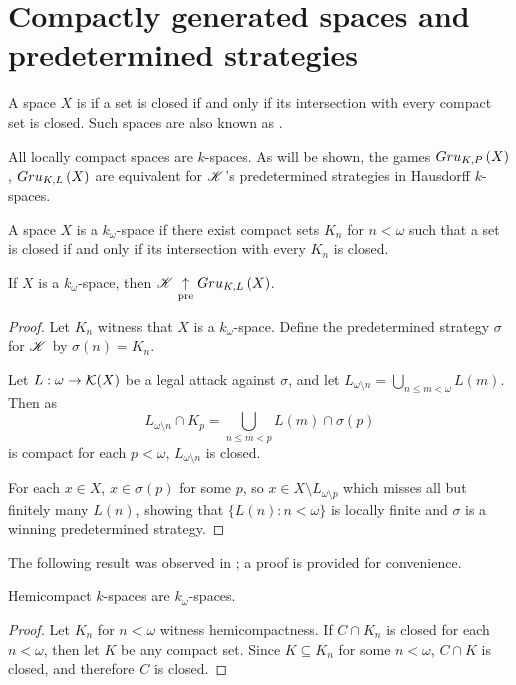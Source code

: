 \section{Compactly generated spaces and predetermined strategies}

\begin{defn}
  A space $X$ is  if a set is closed if and
  only if its intersection with every compact set is closed. Such
  spaces are also known as .
\end{defn}

All locally compact spaces are $k$-spaces. As will be shown,
the games $Gru_{K,P}\left({X}\right)$, $Gru_{K,L}\left({X}\right)$ are equivalent for $\mathscr{K}$'s
predetermined strategies in Hausdorff $k$-spaces.

\begin{defn}
  A space $X$ is a $k_\omega$-space if there exist compact sets $K_n$ for
  $n<\omega$ such that a set is closed if and
  only if its intersection with every $K_n$ is closed.
\end{defn}

\begin{thm}
  If $X$ is a $k_\omega$-space, then
  $\mathscr{K} \underset{\text{pre}}{\uparrow} Gru_{K,L}\left({X}\right)$.
\end{thm}

\begin{proof}
  Let $K_n$ witness that $X$ is a $k_\omega$-space. Define the predetermined
  strategy $\sigma$ for $\mathscr{K}$ by $\sigma(n)=K_n$.

  Let $L:\omega\to\mathcal{K}(X)$ be a legal attack against $\sigma$, and let
  $L_{\omega\setminus n} = \bigcup_{n\leq m<\omega}L(m)$. Then as
    \[
      L_{\omega\setminus n}\cap K_p
        =
      \bigcup_{n\leq m< p}L(m) \cap \sigma(p)
    \]
  is compact for each $p<\omega$, $L_{\omega\setminus n}$ is closed.

  For each $x\in X$, $x\in \sigma(p)$ for some $p$, so
  $x\in X\setminus L_{\omega\setminus p}$ which misses all but finitely
  many $L(n)$, showing that $\{L(n):n<\omega\}$ is locally finite and
  $\sigma$ is a winning predetermined strategy.
\end{proof}

The following result was observed in \cite{MR540599}; a proof is provided
for convenience.

\begin{prop}
  Hemicompact $k$-spaces are $k_\omega$-spaces.
\end{prop}

\begin{proof}
  Let $K_n$ for $n<\omega$ witness hemicompactness.
  If $C\cap K_n$ is closed for each $n<\omega$, then let $K$ be any compact
  set. Since $K\subseteq K_n$ for some $n<\omega$, $C\cap K$ is closed, and
  therefore $C$ is closed.
\end{proof}

